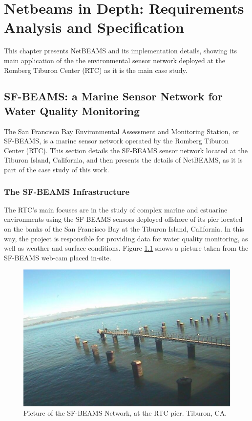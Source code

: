

\chapter{Netbeams in Depth: Requirements Analysis and Specification}

This chapter presents NetBEAMS and its implementation details, showing its
main application of the the environmental sensor network deployed at the
Romberg Tiburon Center (RTC) as it is the main case study.

\section{SF-BEAMS: a Marine Sensor Network for Water Quality Monitoring}

The San Francisco Bay Environmental Assessment and Monitoring Station,
or SF-BEAMS, is a marine sensor network operated by the Romberg Tiburon Center
(RTC). This section details the SF-BEAMS sensor network located at
the Tiburon Island, California, and then presents the details of NetBEAMS, as
it is part of the case study of this work.

\subsection{The SF-BEAMS Infrastructure}

The RTC's main focuses are in the study of complex marine and estuarine
environments using the SF-BEAMS sensors deployed offshore of its pier located
on the banks of the San Francisco Bay at the Tiburon Island, California. In
this way, the project is responsible for providing data for water quality
monitoring, as well as weather and surface conditions. Figure 
\ref{fig:sf-beams} shows a picture taken from the SF-BEAMS web-cam placed
in-site.

\begin{figure}[!b]
  \centering
    \includegraphics[scale=0.7]{../diagrams/cam_image-oct15}
  \caption{Picture of the SF-BEAMS Network, at the RTC pier. Tiburon, CA.}
  \label{fig:sf-beams}
\end{figure}

